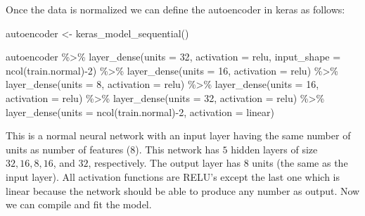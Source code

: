 \documentclass[
  11pt,
]{krantz}
\newenvironment{Shaded}{\begin{snugshade}}{\end{snugshade}}
\newcommand{\AttributeTok}[1]{\textcolor[rgb]{0.61,0.61,0.61}{#1}}
\newcommand{\DecValTok}[1]{\textcolor[rgb]{0.06,0.06,0.06}{#1}}
\newcommand{\FunctionTok}[1]{\textcolor[rgb]{0,0,0}{#1}}
\newcommand{\NormalTok}[1]{#1}
\newcommand{\OtherTok}[1]{\textcolor[rgb]{0.37,0.37,0.37}{#1}}
\newcommand{\SpecialCharTok}[1]{\textcolor[rgb]{0,0,0}{#1}}
\newcommand{\StringTok}[1]{\textcolor[rgb]{0.5,0.5,0.5}{#1}}
\begin{document}
Once the data is normalized we can define the autoencoder in keras as follows:

\begin{Shaded}
\begin{Highlighting}[]
\NormalTok{autoencoder }\OtherTok{\textless{}{-}} \FunctionTok{keras\_model\_sequential}\NormalTok{()}

\NormalTok{autoencoder }\SpecialCharTok{\%\textgreater{}\%}
  \FunctionTok{layer\_dense}\NormalTok{(}\AttributeTok{units =} \DecValTok{32}\NormalTok{, }\AttributeTok{activation =} \StringTok{\textquotesingle{}relu\textquotesingle{}}\NormalTok{,}
              \AttributeTok{input\_shape =} \FunctionTok{ncol}\NormalTok{(train.normal)}\SpecialCharTok{{-}}\DecValTok{2}\NormalTok{) }\SpecialCharTok{\%\textgreater{}\%} 
  \FunctionTok{layer\_dense}\NormalTok{(}\AttributeTok{units =} \DecValTok{16}\NormalTok{, }\AttributeTok{activation =} \StringTok{\textquotesingle{}relu\textquotesingle{}}\NormalTok{) }\SpecialCharTok{\%\textgreater{}\%}
  \FunctionTok{layer\_dense}\NormalTok{(}\AttributeTok{units =} \DecValTok{8}\NormalTok{, }\AttributeTok{activation =} \StringTok{\textquotesingle{}relu\textquotesingle{}}\NormalTok{) }\SpecialCharTok{\%\textgreater{}\%}
  \FunctionTok{layer\_dense}\NormalTok{(}\AttributeTok{units =} \DecValTok{16}\NormalTok{, }\AttributeTok{activation =} \StringTok{\textquotesingle{}relu\textquotesingle{}}\NormalTok{) }\SpecialCharTok{\%\textgreater{}\%}
  \FunctionTok{layer\_dense}\NormalTok{(}\AttributeTok{units =} \DecValTok{32}\NormalTok{, }\AttributeTok{activation =} \StringTok{\textquotesingle{}relu\textquotesingle{}}\NormalTok{) }\SpecialCharTok{\%\textgreater{}\%}
  \FunctionTok{layer\_dense}\NormalTok{(}\AttributeTok{units =} \FunctionTok{ncol}\NormalTok{(train.normal)}\SpecialCharTok{{-}}\DecValTok{2}\NormalTok{, }\AttributeTok{activation =} \StringTok{\textquotesingle{}linear\textquotesingle{}}\NormalTok{)}
\end{Highlighting}
\end{Shaded}

This is a normal neural network with an input layer having the same number of units as number of features (\(8\)). This network has \(5\) hidden layers of size \(32,16,8,16\), and \(32\), respectively. The output layer has \(8\) units (the same as the input layer). All activation functions are RELU's except the last one which is linear because the network should be able to produce any number as output. Now we can compile and fit the model.
\end{document}
